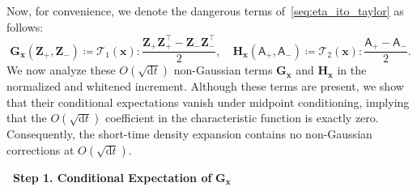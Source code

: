 \documentclass[
 longbibliography,
 twocolumn,
 superscriptaddress,
 amsmath,
 amssymb,
 amsthm,
 amsfonts,
 prl,
 floatfix,
]{revtex4-2}
\newcommand{\matbf}[1]{\boldsymbol{\mathsf{#1}}}
\begin{document}
\begin{widetext}

Now, for convenience, we denote the dangerous terms of~\eqref{seq:eta_ito_taylor} as follows:
\begin{equation}
    \bm{G}_{\bm{x}}(\bm{Z}_+,\bm{Z}_-)\coloneq
    \mathcal{T}_1(\bm{x})\!:\!
    \frac{\bm{Z}_+\bm{Z}_+^\intercal-\bm{Z}_-\bm{Z}_-^\intercal}{2},
    \quad
    \bm{H}_{\bm{x}}(\matbf{A}_+,\matbf{A}_-)\coloneq
    \mathcal{T}_2(\bm{x})\!:\!\frac{
    \matbf{A}_+-\matbf{A}_-}{2}.
    \label{seq:def_G_and_H}
\end{equation}
We now analyze these $O(\sqrt{\mathrm{d}t})$ non-Gaussian terms $\bm{G}_{\bm{x}}$ and $\bm{H}_{\bm{x}}$ in the normalized and whitened increment. Although these terms are present, we show that their conditional expectations vanish under midpoint conditioning, implying that the $O(\sqrt{\mathrm{d}t})$ coefficient in the characteristic function is exactly zero. Consequently, the short-time density expansion contains no non-Gaussian corrections at $O(\sqrt{\mathrm{d}t})$.

\bigskip
\noindent\textbf{\textbullet\ Step 1. Conditional Expectation of} $\bm{G}_{\bm{x}}$


\end{widetext}
\end{document}
